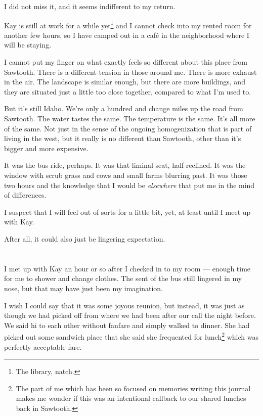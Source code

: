 I did not miss it, and it seems indifferent to my return.

Kay is still at work for a while yet\footnote{The library, natch.} and I cannot check into my rented room for another few hours, so I have camped out in a café in the neighborhood where I will be staying.

I cannot put my finger on what exactly feels so different about this place from Sawtooth. There is a different tension in those around me. There is more exhaust in the air. The landscape is similar enough, but there are more buildings, and they are situated just a little too close together, compared to what I'm used to.

But it's still Idaho. We're only a hundred and change miles up the road from Sawtooth. The water tastes the same. The temperature is the same. It's all more of the same. Not just in the sense of the ongoing homogenization that is part of living in the west, but it really is no different than Sawtooth, other than it's bigger and more expensive.

It was the bus ride, perhaps. It was that liminal seat, half-reclined. It was the window with scrub grass and cows and small farms blurring past. It was those two hours and the knowledge that I would be \emph{elsewhere} that put me in the mind of differences.

I suspect that I will feel out of sorts for a little bit, yet, at least until I meet up with Kay.

After all, it could also just be lingering expectation.

\section{}

I met up with Kay an hour or so after I checked in to my room --- enough time for me to shower and change clothes. The sent of the bus still lingered in my nose, but that may have just been my imagination.

I wish I could say that it was some joyous reunion, but instead, it was just as though we had picked off from where we had been after our call the night before. We said hi to each other without fanfare and simply walked to dinner. She had picked out some sandwich place that she said she frequented for lunch\footnote{The part of me which has been so focused on memories writing this journal makes me wonder if this was an intentional callback to our shared lunches back in Sawtooth.} which was perfectly acceptable fare.

